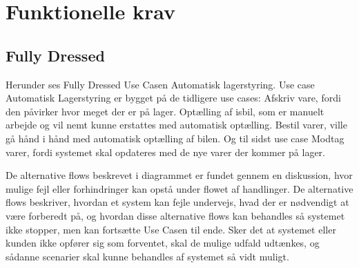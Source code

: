 \section{Funktionelle krav}\label{sec:funktionelle-krav}

\subsection{Fully Dressed} \label{fullydressed}

Herunder ses Fully Dressed Use Casen Automatisk lagerstyring. Use case Automatisk Lagerstyring er bygget på de tidligere use cases: Afskriv vare, fordi den påvirker hvor meget der er på lager. Optælling af isbil, som er manuelt arbejde og vil nemt kunne erstattes med automatisk optælling. Bestil varer, ville gå hånd i hånd med automatisk optælling af bilen. Og til sidst use case Modtag varer, fordi systemet skal opdateres med de nye varer der kommer på lager. 

De alternative flows beskrevet i diagrammet er fundet gennem en diskussion, hvor mulige fejl eller forhindringer kan opstå under flowet af handlinger. De alternative flows beskriver, hvordan et system kan fejle undervejs, hvad der er nødvendigt at være forberedt på, og hvordan disse alternative flows kan behandles så systemet ikke stopper, men kan fortsætte Use Casen til ende. Sker det at systemet eller kunden ikke opfører sig som forventet, skal de mulige udfald udtænkes, og sådanne scenarier skal kunne behandles af systemet så vidt muligt.

